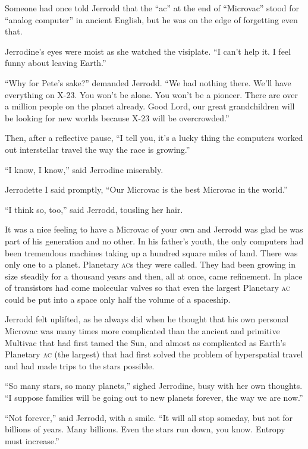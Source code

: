 Someone had once told Jerrodd that the \enquote{ac} at the end of \enquote{Microvac} stood for \enquote{analog computer} in ancient English, but he was on the edge of forgetting even that.

Jerrodine's eyes were moist as she watched the visiplate. \enquote{I can't help it. I feel funny about leaving Earth.}

\enquote{Why for Pete's sake?} demanded Jerrodd. \enquote{We had nothing there. We'll have everything on X-23. You won't be alone. You won't be a pioneer. There are over a million people on the planet already. Good Lord, our great grandchildren will be looking for new worlds because X-23 will be overcrowded.}

Then, after a reflective pause, \enquote{I tell you, it's a lucky thing the computers worked out interstellar travel the way the race is growing.}

\enquote{I know, I know,} said Jerrodine miserably.

Jerrodette I said promptly, \enquote{Our Microvac is the best Microvac in the world.}

\enquote{I think so, too,} said Jerrodd, tousling her hair.

It was a nice feeling to have a Microvac of your own and Jerrodd was glad he was part of his generation and no other. In his father's youth, the only computers had been tremendous machines taking up a hundred square miles of land. There was only one to a planet. Planetary \textsc{ac}s they were called. They had been growing in size steadily for a thousand years and then, all at once, came refinement. In place of transistors had come molecular valves so that even the largest Planetary \textsc{ac} could be put into a space only half the volume of a spaceship.

Jerrodd felt uplifted, as he always did when he thought that his own personal Microvac was many times more complicated than the ancient and primitive Multivac that had first tamed the Sun, and almost as complicated as Earth's Planetary \textsc{ac} (the largest) that had first solved the problem of hyperspatial travel and had made trips to the stars possible.

\enquote{So many stars, so many planets,} sighed Jerrodine, busy with her own thoughts. \enquote{I suppose families will be going out to new planets forever, the way we are now.}

\enquote{Not forever,} said Jerrodd, with a smile. \enquote{It will all stop someday, but not for billions of years. Many billions. Even the stars run down, you know. Entropy must increase.}

